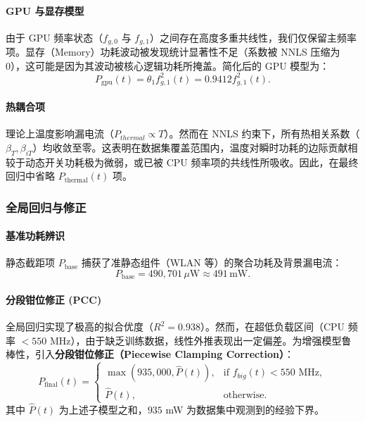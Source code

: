 \documentclass[11pt]{article}
\begin{document}
\paragraph{GPU 与显存模型}
由于 GPU 频率状态（$f_{g,0}$ 与 $f_{g,1}$）之间存在高度多重共线性，我们仅保留主频率项。显存（Memory）功耗波动被发现统计显著性不足（系数被 NNLS 压缩为 0），这可能是因为其波动被核心逻辑功耗所掩盖。简化后的 GPU 模型为：
\begin{equation}
    P_{\text{gpu}}(t) = \theta_1 f_{g,1}^2(t) = 0.9412 f_{g,1}^2(t).
\end{equation}

\paragraph{热耦合项}
理论上温度影响漏电流（$P_{thermal} \propto T$）。然而在 NNLS 约束下，所有热相关系数（$\beta_T, \beta_{iT}$）均收敛至零。这表明在数据集覆盖范围内，温度对瞬时功耗的边际贡献相较于动态开关功耗极为微弱，或已被 CPU 频率项的共线性所吸收。因此，在最终回归中省略 $P_{\text{thermal}}(t)$ 项。

\subsubsection{全局回归与修正}
\paragraph{基准功耗辨识}
静态截距项 $P_{\text{base}}$ 捕获了准静态组件（WLAN 等）的聚合功耗及背景漏电流：
\begin{equation}
    P_{\text{base}} = 490,701 \, \mu\text{W} \approx 491 \, \text{mW}.
\end{equation}

\paragraph{分段钳位修正 (PCC)}
全局回归实现了极高的拟合优度（$R^2 = 0.938$）。然而，在超低负载区间（CPU 频率 $< 550$ MHz），由于缺乏训练数据，线性外推表现出一定偏差。为增强模型鲁棒性，引入\textbf{分段钳位修正（Piecewise Clamping Correction）}：
\begin{equation}
    P_{\text{final}}(t) = 
    \begin{cases} 
    \max(935,000, \hat{P}(t)), & \text{if } f_{big}(t) < 550 \text{ MHz}, \\
    \hat{P}(t), & \text{otherwise}.
    \end{cases}
\end{equation}
其中 $\hat{P}(t)$ 为上述子模型之和，$935$ mW 为数据集中观测到的经验下界。
\end{document}
